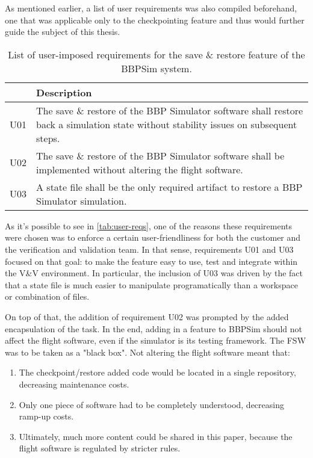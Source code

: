 {As mentioned earlier, a list of user requirements was also compiled beforehand, one that was applicable only to the checkpointing feature and thus would further guide the subject of this thesis. 

\begin{table}[htbp]
	\vspace{12pt}
	\centering
	\begin{tabularx}{\linewidth}{>{\centering}p{3cm} X}
		\toprule
		{\bfseries Requirement\newline Number} & \textbf{Description}\\
		\midrule
		U01 & {The save \& restore of the BBP Simulator software shall restore back a simulation state without stability issues on subsequent steps.}\\
		\midrule
		U02 & {The save \& restore of the BBP Simulator software shall be implemented without altering the flight software.}\\
		\midrule
		U03 & {A state file shall be the only required artifact to restore a BBP Simulator simulation.}\\
		\bottomrule
	\end{tabularx}
	\caption{List of user-imposed requirements for the save \& restore feature of the \gls{BBPSim} system.}
	\label{tab:user-reqs}
\end{table}

As it's possible to see in \autoref{tab:user-reqs}, one of the reasons these requirements were chosen was to enforce a certain user-friendliness for both the customer and the verification and validation team. In that sense, requirements U01 and U03 focused on that goal: to make the feature easy to use, test and integrate within the V\&V environment. In particular, the inclusion of U03 was driven by the fact that a state file is much easier to manipulate programatically than a workspace or combination of files.

On top of that, the addition of requirement U02 was prompted by the added encapsulation of the task. In the end, adding in a feature to \gls{BBPSim} should not affect the flight software, even if the simulator is its testing framework. The FSW was to be taken as a "black box". Not altering the flight software meant that:
\begin{enumerate}
	\item The checkpoint/restore added code would be located in a single repository, decreasing maintenance costs.
	\item Only one piece of software had to be completely understood, decreasing ramp-up costs.
	\item Ultimately, much more content could be shared in this paper, because the flight software is regulated by stricter rules.
\end{enumerate}

}
